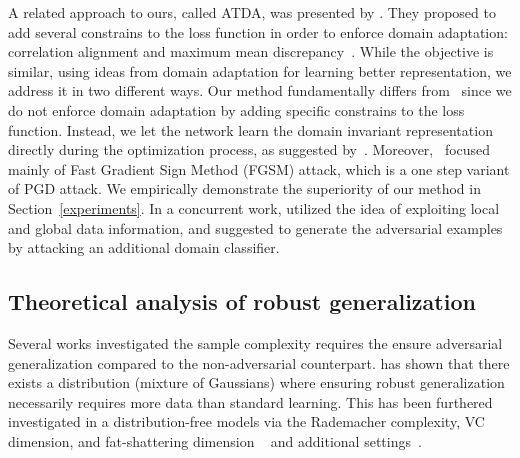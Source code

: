 A related approach to ours, called ATDA,
was presented by \citet{song2018improving}.
They proposed to add several constrains to the loss function in order to enforce domain adaptation: correlation alignment and maximum mean discrepancy~\citep{borgwardt2006integrating, sun2016deep}. While the objective is similar, using ideas from domain adaptation for learning better representation, we address it in two different ways. Our method fundamentally differs from~\citet{song2018improving} since we do not enforce domain adaptation by adding specific constrains to the loss function. Instead, we let the network learn the domain invariant representation directly during the optimization process, as suggested by~\citet{ganin2015unsupervised,ganin2016domain}. Moreover,~\citet{song2018improving} focused mainly of Fast Gradient Sign Method (FGSM) attack, which is a one step variant of PGD attack. We empirically demonstrate the superiority of our method in Section~\ref{experiments}. 
In a concurrent work, \citet{qian2021improving} utilized the idea of exploiting local and global data information, and suggested to generate the adversarial examples by attacking an additional domain classifier.

\subsection{Theoretical analysis of robust generalization}
Several works investigated the sample complexity requires the ensure adversarial generalization compared to the non-adversarial counterpart.
\citet{schmidt2018adversarially} has shown that there exists a distribution (mixture of Gaussians) where ensuring robust generalization necessarily requires more data than standard learning. This has been furthered investigated in a distribution-free models via the Rademacher complexity, VC dimension, and fat-shattering dimension ~\citep{yin2019rademacher,attias2019improved,khim2018adversarial,awasthi2020rademacher,cullina2018pac,montasser2019vc,tsai2021formalizing,attias2022characterization,attias2022adversarially} and additional settings~\citep{diochnos2018adversarial,carmon2019unlabeled}.


